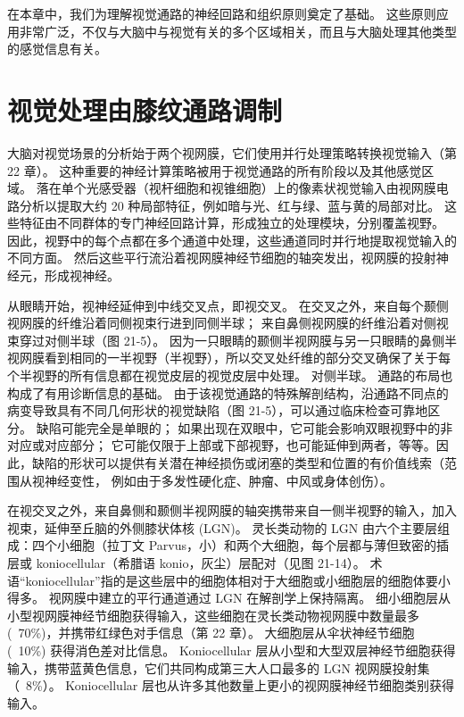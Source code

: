 在本章中，我们为理解视觉通路的神经回路和组织原则奠定了基础。 这些原则应用非常广泛，不仅与大脑中与视觉有关的多个区域相关，而且与大脑处理其他类型的感觉信息有关。


\section{视觉处理由膝纹通路调制}
大脑对视觉场景的分析始于两个视网膜，它们使用并行处理策略转换视觉输入（第 22 章）。 这种重要的神经计算策略被用于视觉通路的所有阶段以及其他感觉区域。 落在单个光感受器（视杆细胞和视锥细胞）上的像素状视觉输入由视网膜电路分析以提取大约 20 种局部特征，例如暗与光、红与绿、蓝与黄的局部对比。 这些特征由不同群体的专门神经回路计算，形成独立的处理模块，分别覆盖视野。 因此，视野中的每个点都在多个通道中处理，这些通道同时并行地提取视觉输入的不同方面。 然后这些平行流沿着视网膜神经节细胞的轴突发出，视网膜的投射神经元，形成视神经。

从眼睛开始，视神经延伸到中线交叉点，即视交叉。 在交叉之外，来自每个颞侧视网膜的纤维沿着同侧视束行进到同侧半球； 来自鼻侧视网膜的纤维沿着对侧视束穿过对侧半球（图 21-5）。 因为一只眼睛的颞侧半视网膜与另一只眼睛的鼻侧半视网膜看到相同的一半视野（半视野），所以交叉处纤维的部分交叉确保了关于每个半视野的所有信息都在视觉皮层的视觉皮层中处理。 对侧半球。 通路的布局也构成了有用诊断信息的基础。 由于该视觉通路的特殊解剖结构，沿通路不同点的病变导致具有不同几何形状的视觉缺陷（图 21-5），可以通过临床检查可靠地区分。 缺陷可能完全是单眼的； 如果出现在双眼中，它可能会影响双眼视野中的非对应或对应部分； 它可能仅限于上部或下部视野，也可能延伸到两者，等等。因此，缺陷的形状可以提供有关潜在神经损伤或闭塞的类型和位置的有价值线索（范围从视神经变性， 例如由于多发性硬化症、肿瘤、中风或身体创伤）。

在视交叉之外，来自鼻侧和颞侧半视网膜的轴突携带来自一侧半视野的输入，加入视束，延伸至丘脑的外侧膝状体核 (LGN)。 灵长类动物的 LGN 由六个主要层组成：四个小细胞（拉丁文 Parvus，小）和两个大细胞，每个层都与薄但致密的插层或 koniocellular（希腊语 konio，灰尘）层配对（见图 21-14）。 术语“koniocellular”指的是这些层中的细胞体相对于大细胞或小细胞层的细胞体要小得多。 视网膜中建立的平行通道通过 LGN 在解剖学上保持隔离。 细小细胞层从小型视网膜神经节细胞获得输入，这些细胞在灵长类动物视网膜中数量最多 (~70\%)，并携带红绿色对手信息（第 22 章）。 大细胞层从伞状神经节细胞 (~10\%) 获得消色差对比信息。 Koniocellular 层从小型和大型双层神经节细胞获得输入，携带蓝黄色信息，它们共同构成第三大人口最多的 LGN 视网膜投射集（~8\%）。 Koniocellular 层也从许多其他数量上更小的视网膜神经节细胞类别获得输入。

